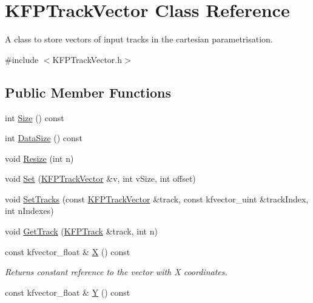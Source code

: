 \hypertarget{classKFPTrackVector}{}\section{K\+F\+P\+Track\+Vector Class Reference}
\label{classKFPTrackVector}


A class to store vectors of input tracks in the cartesian parametrisation.  




{\ttfamily \#include $<$K\+F\+P\+Track\+Vector.\+h$>$}

\subsection*{Public Member Functions}
\begin{DoxyCompactItemize}
\item 
int \hyperlink{classKFPTrackVector_aef516e6ae4eae72f3282e68f390c5f4b}{Size} () const 
\item 
int \hyperlink{classKFPTrackVector_af89c19d09d956047af09f0ce9c72b9ae}{Data\+Size} () const 
\item 
void \hyperlink{classKFPTrackVector_a070f8d025530e5a5f2f9088053f983c4}{Resize} (int n)
\item 
void \hyperlink{classKFPTrackVector_a3a2454337bcc3909aee1431ac7866d49}{Set} (\hyperlink{classKFPTrackVector}{K\+F\+P\+Track\+Vector} \&v, int v\+Size, int offset)
\item 
void \hyperlink{classKFPTrackVector_ab878d44b2d02fa36d3ed4398f969783f}{Set\+Tracks} (const \hyperlink{classKFPTrackVector}{K\+F\+P\+Track\+Vector} \&track, const kfvector\+\_\+uint \&track\+Index, int n\+Indexes)
\item 
void \hyperlink{classKFPTrackVector_a48ca02991f7d847fdeee239e465dc1ba}{Get\+Track} (\hyperlink{classKFPTrack}{K\+F\+P\+Track} \&track, int n)
\item 
const kfvector\+\_\+float \& \hyperlink{classKFPTrackVector_aa2f6e7bbebcd78a4f6a79a9485548ec1}{X} () const \hypertarget{classKFPTrackVector_aa2f6e7bbebcd78a4f6a79a9485548ec1}{}\label{classKFPTrackVector_aa2f6e7bbebcd78a4f6a79a9485548ec1}

\begin{DoxyCompactList}\small\item\em Returns constant reference to the vector with X coordinates. \end{DoxyCompactList}\item 
const kfvector\+\_\+float \& \hyperlink{classKFPTrackVector_a477913e25d96a009a0ee6e4571285337}{Y} () const \hypertarget{classKFPTrackVector_a477913e25d96a009a0ee6e4571285337}{}\label{classKFPTrackVector_a477913e25d96a009a0ee6e4571285337}


\end{DoxyCompactItemize}
